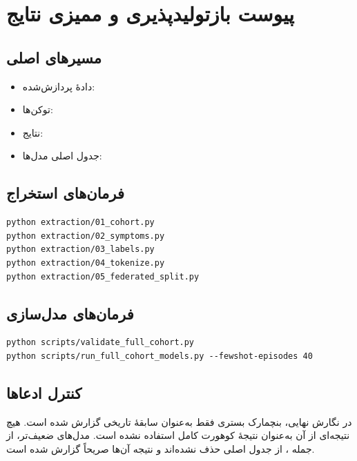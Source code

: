 \chapter{پیوست بازتولیدپذیری و ممیزی نتایج}
\label{app:reproducibility}

\section{مسیرهای اصلی}
\begin{itemize}
\item دادۀ پردازش‌شده: \texttt{}
\item توکن‌ها: \texttt{}
\item نتایج: \texttt{}
\item جدول اصلی مدل‌ها: \texttt{}
\end{itemize}

\section{فرمان‌های استخراج}
\begin{latin}
\begin{verbatim}
python extraction/01_cohort.py
python extraction/02_symptoms.py
python extraction/03_labels.py
python extraction/04_tokenize.py
python extraction/05_federated_split.py
\end{verbatim}
\end{latin}

\section{فرمان‌های مدل‌سازی}
\begin{latin}
\begin{verbatim}
python scripts/validate_full_cohort.py
python scripts/run_full_cohort_models.py --fewshot-episodes 40
\end{verbatim}
\end{latin}

\section{کنترل ادعاها}
در نگارش نهایی، بنچمارک  بستری فقط به‌عنوان سابقۀ تاریخی گزارش شده است. هیچ نتیجه‌ای از آن به‌عنوان نتیجۀ کوهورت کامل استفاده نشده است. مدل‌های ضعیف‌تر، از جمله ، از جدول اصلی حذف نشده‌اند و نتیجه آن‌ها صریحاً گزارش شده است.
